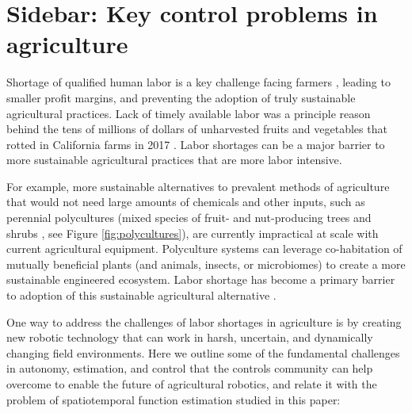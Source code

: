 \section[How can control engineers help agriculture?]{Sidebar: Key control problems in agriculture}\label{sb:ag}


Shortage of qualified human labor is a key challenge facing farmers \cite{richards2018immigration,hertz2013there}, leading to smaller profit margins, and preventing the adoption of truly sustainable agricultural practices. Lack of timely available labor was a principle reason behind the tens of millions of dollars of unharvested fruits and vegetables that rotted in California farms in 2017 \cite{guthman2017paradoxes,RN4026}.  Labor shortages can be a major barrier to more sustainable agricultural practices that are more labor intensive.

For example, more sustainable alternatives to prevalent methods of agriculture that would not need large amounts of chemicals and other inputs, such as perennial polycultures (mixed species of fruit- and nut-producing trees and shrubs \cite{lovell2017temperate}, see Figure \ref{fig:polycultures}), are currently impractical at scale with current agricultural equipment. Polyculture systems can leverage co-habitation of mutually beneficial plants (and animals, insects, or microbiomes) to create a more sustainable engineered ecosystem. Labor shortage has become a primary barrier to adoption of this sustainable agricultural alternative \cite{RN4017,RN4018}.  


One way to address the challenges of labor shortages in agriculture is by creating new robotic technology that can work in harsh, uncertain, and dynamically changing field environments. 
Here we outline some of the fundamental challenges in autonomy, estimation, and control that the controls community can help overcome to enable the future of agricultural robotics, and relate it with the problem of spatiotemporal function estimation studied in this paper:


